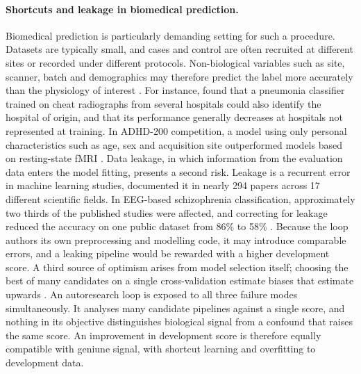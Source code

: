 \documentclass[11pt]{article}
\begin{document}
\paragraph{Shortcuts and leakage in biomedical prediction.}\label{sec:intro-shortcuts} Biomedical prediction is particularly demanding setting for such a procedure. Datasets are typically small, and cases and control are often recruited at different sites or recorded under different protocols. Non-biological variables such as site, scanner, batch and demographics may therefore predict the label more accurately than the physiology of interest \citep{geirhos2020shortcut,varoquaux2022failures}. 
For instance, \citet{zech2018confounding} found that a pneumonia classifier trained on cheat radiographs from several hospitals could also identify the hospital of origin, and that its performance generally decreases at hospitals not represented at training. In ADHD-200 competition, a model 
using only personal characteristics such as age, sex and acquisition site outperformed models based on resting-state fMRI \citep{brown2012adhd200}. 
Data leakage, in which information from the evaluation data enters the model fitting, presents a second risk. Leakage is a recurrent error in machine learning studies, \citet{kapoor2023leakage} documented it in nearly 294 papers across 17 different scientific fields. In EEG-based schizophrenia classification, approximately two thirds of the published studies were affected, and correcting for leakage reduced the accuracy on one public dataset from 86\% to 58\% \citep{racz2025szleakage}. Because the loop authors its own preprocessing and modelling code, 
it may introduce comparable errors, and a leaking pipeline would be rewarded with a higher development score. A third source of optimism arises from model selection itself; choosing the best of many candidates on a single cross-validation estimate biases that estimate upwards \citep{cawley2010overfitting}. 
An autoresearch loop is exposed to all three failure modes simultaneously. It analyses many candidate pipelines against a single score, and nothing in its objective distinguishes biological signal from a confound that raises the same score. An improvement in development score is therefore equally compatible with geniune signal, with shortcut learning and overfitting to development data.
\end{document}
